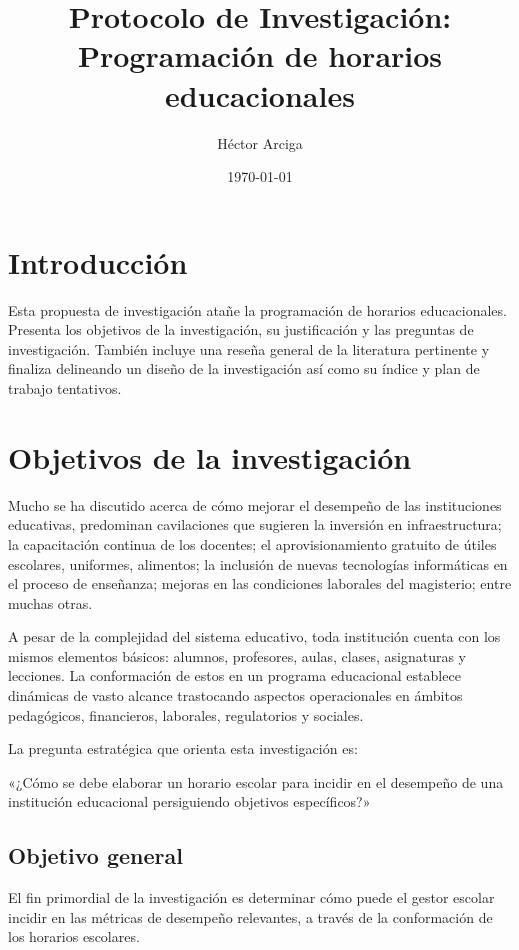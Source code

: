 \documentclass[spanish,draft,12pt,headsepline,footsepline,paper=letter]{scrreprt}
\begin{document}
\title{Protocolo de Investigación: Programación de horarios educacionales}
\author{Héctor Arciga}
\date{\today}

\maketitle

\section*{Introducción}
Esta propuesta de investigación atañe la programación de horarios educacionales. Presenta los objetivos de la investigación, su justificación y las preguntas de investigación. También incluye una reseña general de la literatura pertinente y finaliza delineando un diseño de la investigación así como su índice y plan de trabajo tentativos.

\section*{Objetivos de la investigación}
Mucho se ha discutido acerca de cómo mejorar el desempeño de las instituciones educativas, predominan cavilaciones que sugieren la inversión en infraestructura; la capacitación continua de los docentes; el aprovisionamiento gratuito de útiles escolares, uniformes, alimentos; la  inclusión de nuevas tecnologías informáticas en el proceso de enseñanza; mejoras en las condiciones laborales del magisterio; entre muchas otras. 

A pesar de la complejidad del sistema educativo, toda institución cuenta con los mismos elementos básicos: alumnos, profesores, aulas, clases, asignaturas y lecciones. La conformación de estos en un programa educacional establece dinámicas de vasto alcance trastocando aspectos operacionales en ámbitos pedagógicos, financieros, laborales, regulatorios y sociales.

La pregunta estratégica que orienta esta investigación es: 

«¿Cómo se debe elaborar un horario escolar para incidir en el desempeño de una institución educacional persiguiendo objetivos específicos?»

\subsection*{Objetivo general}

El fin primordial de la investigación es determinar cómo puede el gestor escolar incidir en las métricas de desempeño relevantes, a través de la conformación de los horarios escolares.
\end{document}
